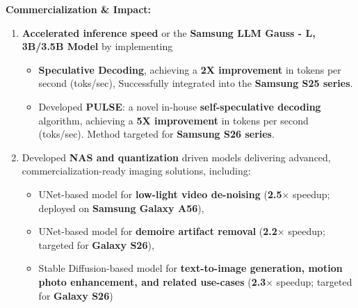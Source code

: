 \documentclass[letterpaper,11pt]{article}
\newcommand{\resumeItem}[1]{
  \item\small{
    {#1 \vspace{-2pt}}
  }
}
\begin{document}
      \resumeItem{\textbf{Commercialization \& Impact: }
      
      \begin{enumerate}
        \item \textbf{Accelerated inference speed} or the \textbf{Samsung LLM Gauss - L, 3B/3.5B Model} by implementing 
        \begin{itemize}

        \item \textbf{Speculative Decoding}, achieving a \textbf{2X improvement} in tokens per second (toks/sec), Successfully integrated into the \textbf{Samsung S25 series}. 
        \item Developed \textbf{PULSE}: a novel in-house \textbf{self-speculative decoding} algorithm, achieving a \textbf{5X improvement} in tokens per second (toks/sec). Method targeted for \textbf{Samsung S26 series}.
        \end{itemize}

    \item Developed \textbf{NAS and quantization} driven models delivering advanced, commercialization-ready imaging solutions, including:
    \begin{itemize}
        \item UNet-based model for \textbf{low-light video de-noising} (\textbf{2.5}× speedup; deployed on \textbf{Samsung Galaxy A56}),
        \item UNet-based model for \textbf{demoire artifact removal} (\textbf{2.2}× speedup; targeted for \textbf{Galaxy S26}),
        \item Stable Diffusion-based model for \textbf{text-to-image generation, motion photo enhancement, and related use-cases} (\textbf{2.3}× speedup; targeted for \textbf{Galaxy S26})
    \end{itemize}
      \end{enumerate} }
\end{document}
